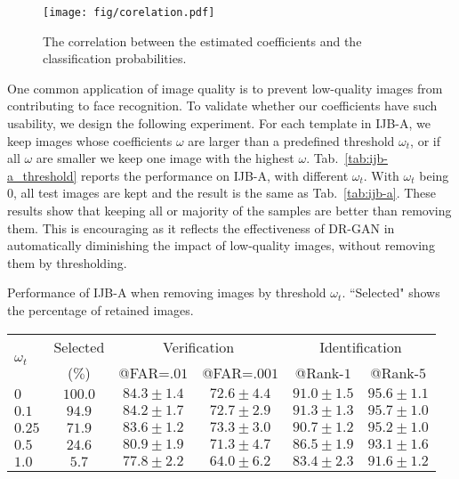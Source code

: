 \documentclass[10pt,journal,compsoc]{IEEEtran}
\begin{document}
\begin{figure}[t!]
\begin{center}
\texttt{[image: fig/corelation.pdf]}
\end{center}
\vspace{-1mm}
\caption{The correlation between the estimated coefficients and the classification probabilities.}
\label{fig:coeff_corr}
\end{figure}
One common application of image quality is to prevent low-quality images from contributing to face recognition. 
To validate whether our coefficients have such usability, we design the following experiment.
For each template in IJB-A, we keep images whose coefficients $\omega$ are larger than a predefined threshold $\omega_t$, or if all $\omega$ are smaller we keep one image with the highest $\omega$.
Tab.~\ref{tab:ijb-a_threshold} reports the performance on IJB-A, with different $\omega_t$. %
With $\omega_t$ being $0$, all test images are kept and the result is the same as Tab.~\ref{tab:ijb-a}. 
These results show that keeping all or majority of the samples are better than removing them.
This is encouraging as it reflects the effectiveness of DR-GAN in automatically diminishing the impact of low-quality images, without removing them by thresholding.
\caption{\small{Performance of IJB-A when removing images by threshold $\omega_t$. ``Selected" shows the percentage of retained images.}}
\vspace{-3mm}
\small
\begin{center}
\begin{tabular}{@{\hskip .5mm}l@{\hskip 1.5mm}c@{\hskip 1.5mm}c@{\hskip 1.5mm}c@{\hskip 1.5mm}c@{\hskip 1.5mm}c@{\hskip .5mm}}
\toprule
\multirow{2}{*}{$\omega_t$}& Selected & \multicolumn{2}{c}{Verification} & \multicolumn{2}{c}{Identification} \\ \cmidrule(r){3-4} \cmidrule(r){5-6}
 & ($\%$) & @FAR=$.01$ & @FAR=$.001$ & @Rank-$1$ & @Rank-$5$ \\ \midrule 
$0   $ &$100.0$ & ${\mathbf{84.3}} \pm 1.4$ & $72.6 \pm 4.4$ & $91.0\pm 1.5$ & $95.6\pm1.1$ \\
$0.1 $ &$94.9$ & $84.2 \pm 1.7$ & $72.7 \pm 2.9$ & ${\mathbf{91.3}}\pm 1.3$ & ${\mathbf{95.7}}\pm1.0$ \\
$0.25$ &$71.9$ & $83.6 \pm 1.2$ & ${\mathbf{73.3}} \pm 3.0$ & $90.7\pm 1.2$ & $95.2\pm1.0$ \\
$0.5 $ &$24.6$ & $80.9 \pm 1.9$ & $71.3 \pm 4.7$ & $86.5\pm 1.9$ & $93.1\pm1.6$ \\
$1.0 $ &$5.7$ & $77.8 \pm 2.2$ & $64.0 \pm 6.2$ & $83.4\pm 2.3$ & $91.6\pm 1.2$ \\ \bottomrule
\end{tabular}
\end{center}
\end{document}
